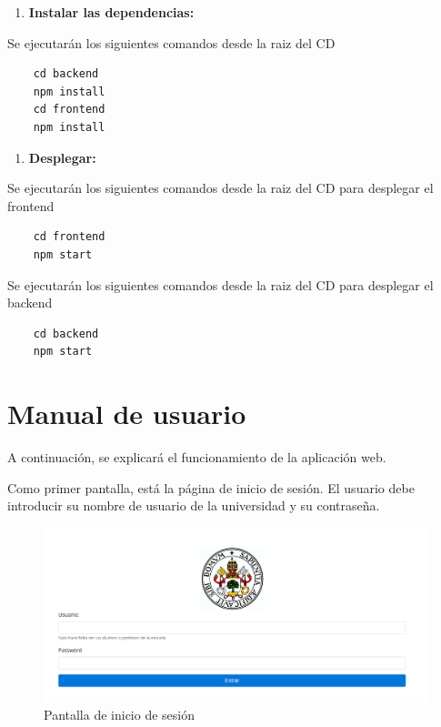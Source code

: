 \documentclass[openright,twoside,10pt]{book}
\providecommand{\tightlist}{%
  \setlength{\itemsep}{0pt}\setlength{\parskip}{0pt}}
\begin{document}
    \begin{enumerate}
    \def\labelenumi{\arabic{enumi}.}
    \setcounter{enumi}{1}
    \tightlist
    \item
      \textbf{Instalar las dependencias:}
    \end{enumerate}
    
    Se ejecutarán los siguientes comandos desde la raiz del CD
    
    \begin{verbatim}
    cd backend
    npm install
    cd frontend
    npm install
    \end{verbatim}
    
    \begin{enumerate}
    \def\labelenumi{\arabic{enumi}.}
    \setcounter{enumi}{2}
    \tightlist
    \item
      \textbf{Desplegar:}
    \end{enumerate}
    
    Se ejecutarán los siguientes comandos desde la raiz del CD para
    desplegar el frontend
    
    \begin{verbatim}
    cd frontend
    npm start
    \end{verbatim}
    
    Se ejecutarán los siguientes comandos desde la raiz del CD para
    desplegar el backend
    
    \begin{verbatim}
    cd backend
    npm start
    \end{verbatim}
    
    \chapter{ Manual de usuario }
    
    A continuación, se explicará el funcionamiento de la aplicación web.
    
    Como primer pantalla, está la página de inicio de sesión. El usuario
    debe introducir su nombre de usuario de la universidad y su contraseña.
    
    \begin{figure}[H]
        \begin{center}
            \includegraphics[width=\textwidth]{img/manual/login.png}
        \end{center}
        \caption{Pantalla de inicio de sesión}
    \end{figure}
    
\end{document}
